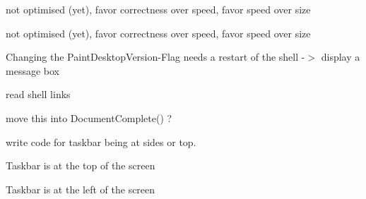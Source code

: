 
\begin{DoxyRefList}
\item[\label{todo__todo000095}%
\Hypertarget{todo__todo000095}%
文件 \hyperlink{asn1__dec_8c}{asn1\+\_\+dec.c} ]not optimised (yet), favor correctness over speed, favor speed over size  
\item[\label{todo__todo000096}%
\Hypertarget{todo__todo000096}%
文件 \hyperlink{asn1__enc_8c}{asn1\+\_\+enc.c} ]not optimised (yet), favor correctness over speed, favor speed over size  
\item[\label{todo__todo000010}%
\Hypertarget{todo__todo000010}%
成员 \hyperlink{struct_background_window_a53a46176409524ff6f457230e07d3229}{Background\+Window\+:\+:Wnd\+Proc} (U\+I\+NT nmsg, W\+P\+A\+R\+AM wparam, L\+P\+A\+R\+AM lparam)]Changing the Paint\+Desktop\+Version-\/\+Flag needs a restart of the shell -\/$>$ display a message box  
\item[\label{todo__todo000059}%
\Hypertarget{todo__todo000059}%
成员 \hyperlink{struct_bookmark_list_a473d8d4b6ddf51a2b2c01fa5de6045ea}{Bookmark\+List\+:\+:import\+\_\+\+I\+E\+\_\+favorites} (struct \hyperlink{struct_shell_directory}{Shell\+Directory} \&dir, H\+W\+ND hwnd)]read shell links  
\item[\label{todo__todo000049}%
\Hypertarget{todo__todo000049}%
成员 \hyperlink{struct_browser_navigator_ad6dc6468c14e4c4979361686e0e156db}{Browser\+Navigator\+:\+:navigated} (L\+P\+C\+T\+S\+TR url)]move this into Document\+Complete() ?  
\item[\label{todo__todo000084}%
\Hypertarget{todo__todo000084}%
成员 \hyperlink{struct_child_window_ab3516027124ec7f703d95b54bfdd83c4}{Child\+Window\+:\+:Wnd\+Proc} (U\+I\+NT nmsg, W\+P\+A\+R\+AM wparam, L\+P\+A\+R\+AM lparam)]
\item[\label{todo__todo000055}%
\Hypertarget{todo__todo000055}%
成员 \hyperlink{struct_desktop_bar_a47e1906c84e318b43d8e33bf141a4ea6}{Desktop\+Bar\+:\+:Control\+Resize} (W\+P\+A\+R\+AM wparam, L\+P\+A\+R\+AM lparam)]write code for taskbar being at sides or top. 

Taskbar is at the top of the screen 

Taskbar is at the left of the screen 


\end{DoxyRefList}
